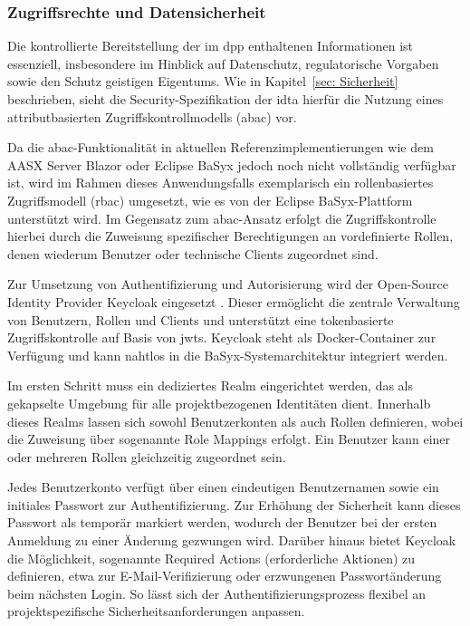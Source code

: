 \subsubsection{Zugriffsrechte und Datensicherheit}

Die kontrollierte Bereitstellung der im \acs{dpp} enthaltenen Informationen ist essenziell, insbesondere im Hinblick auf Datenschutz, regulatorische Vorgaben sowie den Schutz geistigen Eigentums.  
Wie in Kapitel~\ref{sec: Sicherheit} beschrieben, sieht die Security-Spezifikation der \acs{idta} hierfür die Nutzung eines attributbasierten Zugriffskontrollmodells (\acs{abac}) vor.

Da die \acs{abac}-Funktionalität in aktuellen Referenzimplementierungen wie dem AASX Server Blazor oder Eclipse BaSyx jedoch noch nicht vollständig verfügbar ist, wird im Rahmen dieses Anwendungsfalls exemplarisch ein rollenbasiertes Zugriffsmodell (\acs{rbac}) umgesetzt, wie es von der Eclipse BaSyx-Plattform unterstützt wird.  
Im Gegensatz zum \acs{abac}-Ansatz erfolgt die Zugriffskontrolle hierbei durch die Zuweisung spezifischer Berechtigungen an vordefinierte Rollen, denen wiederum Benutzer oder technische Clients zugeordnet sind.

Zur Umsetzung von Authentifizierung und Autorisierung wird der Open-Source Identity Provider Keycloak eingesetzt \cite{Keycloak}.  
Dieser ermöglicht die zentrale Verwaltung von Benutzern, Rollen und Clients und unterstützt eine tokenbasierte Zugriffskontrolle auf Basis von \acsp{jwt}.  
Keycloak steht als Docker-Container zur Verfügung und kann nahtlos in die BaSyx-Systemarchitektur integriert werden.

Im ersten Schritt muss ein dediziertes Realm eingerichtet werden, das als gekapselte Umgebung für alle projektbezogenen Identitäten dient.  
Innerhalb dieses Realms lassen sich sowohl Benutzerkonten als auch Rollen definieren, wobei die Zuweisung über sogenannte Role Mappings erfolgt.  
Ein Benutzer kann einer oder mehreren Rollen gleichzeitig zugeordnet sein.

Jedes Benutzerkonto verfügt über einen eindeutigen Benutzernamen sowie ein ini\-tiales Passwort zur Authentifizierung.  
Zur Erhöhung der Sicherheit kann dieses Passwort als temporär markiert werden, wodurch der Benutzer bei der ersten Anmeldung zu einer Änderung gezwungen wird.  
Darüber hinaus bietet Keycloak die Möglichkeit, sogenannte Required Actions (erforderliche Aktionen) zu definieren, etwa zur E-Mail-Verifizierung oder erzwungenen Passwortänderung beim nächsten Login.  
So lässt sich der Authentifizierungsprozess flexibel an projektspezifische Sicherheitsanforderungen anpassen.

